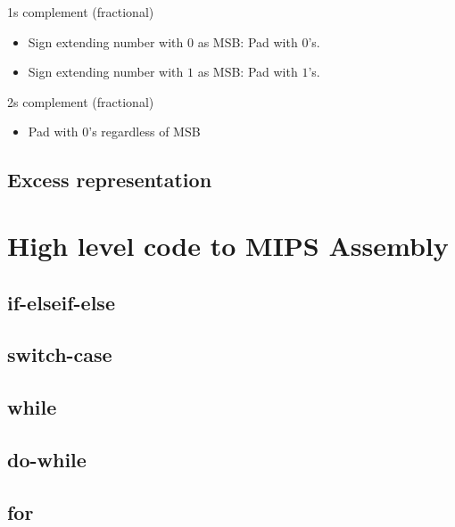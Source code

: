 \documentclass{article}
\begin{document}
1s complement (fractional)
\begin{itemize}
	\item Sign extending number with $0$ as MSB: Pad with $0$'s.
	\item Sign extending number with $1$ as MSB: Pad with $1$'s.
\end{itemize}

2s complement (fractional)
\begin{itemize}
	\item Pad with $0$'s regardless of MSB
\end{itemize}

\subsection{Excess representation}


\section{High level code to MIPS Assembly}
\subsection{if-elseif-else}

\subsection{switch-case}

\subsection{while}

\subsection{do-while}

\subsection{for}
\end{document}
